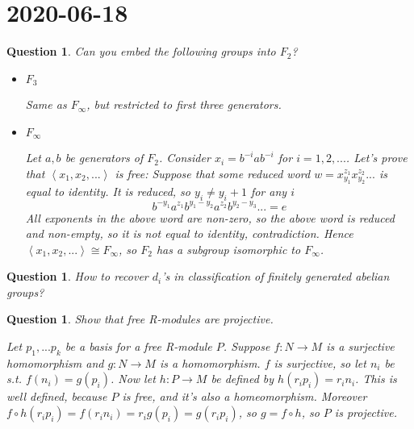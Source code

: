 \documentclass[a4paper]{article}
\newtheorem{que}[thm]{Question}
\begin{document}
\section*{ 2020-06-18}

\begin{que} Can you embed the following groups into $F_2$?
	\begin{itemize}
		\item $F_3$ 
		
		Same as $F_\infty$, but restricted to first three generators.
		\item $F_\infty$ 
		
		Let $a, b$ be generators of $F_2$. Consider $x_i = b^{-i} a b^{-i}$ for $i = 1, 2, ...$.
			Let's prove that $\left< x_1, x_2, ... \right>$ is free:
			Suppose that some reduced word $w = x_{y_1}^{z_1} x_{y_2}^{z_2} ...$ is equal to identity.
			It is reduced, so $y_i \neq y_i+1$ for any $i$	
			$$b^{-y_1} a^{z_1} b^{y_1- y_2} a^{z_2} b^{y_2 - y_3} ... = e$$
			All exponents in the above word are non-zero, so the above word is reduced and non-empty, so it is not equal to identity, contradiction.
			Hence $\left< x_1, x_2, ... \right> \cong F_{\infty}$, so $F_2$ has a subgroup isomorphic to $F_{\infty}$.
			
	\end{itemize}
\end{que} 
\begin{que} How to recover $d_i$'s in classification of finitely generated abelian groups?
	
\end{que}
\begin{que} Show that free R-modules are projective.
	
	Let $p_1, ... p_k$ be a basis for a free R-module $P$. Suppose $f : N \to M$ is a surjective homomorphism and $g: N \to M$ is a homomorphism. $f$ is surjective, so let $n_i$ be s.t. $f(n_i) = g(p_i)$. 
	Now let $h : P \to M$ be defined by $h(r_i p_i)=r_i n_i$. This is well defined, because $P$ is free, and it's also a homeomorphism. Moreover $f \circ h(r_i p_i) = f(r_i n_i) = r_i g(p_i) = g(r_i p_i)$, so $g = f \circ h$, so $P$ is projective.
\end{que}
\end{document}
